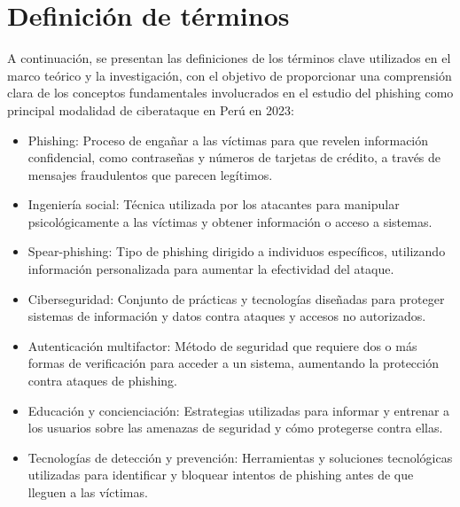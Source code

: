 \section{Definición de términos}
A continuación, se presentan las definiciones de los términos clave utilizados en el marco teórico y la investigación, con el objetivo de proporcionar una comprensión clara de los conceptos fundamentales involucrados en el estudio del phishing como principal modalidad de ciberataque en Perú en 2023:
\begin{itemize}
    \item Phishing: Proceso de engañar a las víctimas para que revelen información confidencial, como contraseñas y números de tarjetas de crédito, a través de mensajes fraudulentos que parecen legítimos.
    \item Ingeniería social: Técnica utilizada por los atacantes para manipular psicológicamente a las víctimas y obtener información o acceso a sistemas.
    \item Spear-phishing: Tipo de phishing dirigido a individuos específicos, utilizando información personalizada para aumentar la efectividad del ataque.
    \item Ciberseguridad: Conjunto de prácticas y tecnologías diseñadas para proteger sistemas de información y datos contra ataques y accesos no autorizados.
    \item Autenticación multifactor: Método de seguridad que requiere dos o más formas de verificación para acceder a un sistema, aumentando la protección contra ataques de phishing.
    \item Educación y concienciación: Estrategias utilizadas para informar y entrenar a los usuarios sobre las amenazas de seguridad y cómo protegerse contra ellas.
    \item Tecnologías de detección y prevención: Herramientas y soluciones tecnológicas utilizadas para identificar y bloquear intentos de phishing antes de que lleguen a las víctimas.
\end{itemize}